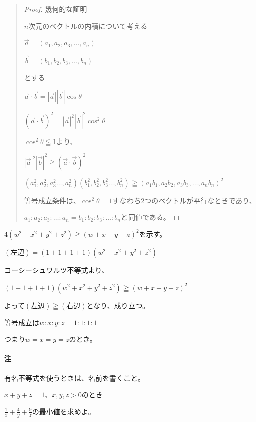 \documentclass[uplatex,dvipdfmx]{jsbook}
\begin{document}
\begin{quote}
    \begin{proof}
        幾何的な証明

        $n$次元のベクトルの内積について考える

        $\vec{a}=\left(a_1,a_2,a_3,\dots,a_n\right)$

        $\vec{b}=\left(b_1,b_2,b_3,\dots,b_n\right)$

        とする

        $\vec{a}\cdot\vec{b}=|\vec{a}||\vec{b}|\cos\theta$

        $\left(\vec{a}\cdot\vec{b}\right)^2=|\vec{a}|^2|\vec{b}|^2\cos^2\theta$

        $\cos^2\theta\leqq1$より、

        $|\vec{a}|^2|\vec{b}|^2\geqq\left(\vec{a}\cdot\vec{b}\right)^2$

        $\left(a^2_1,a^2_2,a^2_3\dots,a^2_n\right)\left(b^2_1,b^2_2,b^2_3\dots,b^2_n\right)\geqq\left(a_1b_1,a_2b_2,a_3b_3,\dots,a_nb_n\right)^2$

        等号成立条件は、$\cos^2\theta=1$すなわち2つのベクトルが平行なときであり、

        $a_1:a_2:a_3:\dots:a_n=b_1:b_2:b_3:\dots:b_n$と同値である。
    \end{proof}
\end{quote}

\begin{problem}[例題]
    $4\left(w^2+x^2+y^2+z^2\right)\geqq \left(w+x+y+z\right)^2$を示す。

    $\left(\text{左辺}\right)=\left(1+1+1+1\right)\left(w^2+x^2+y^2+z^2\right)$

    コーシーシュワルツ不等式より、

    $\left(1+1+1+1\right)\left(w^2+x^2+y^2+z^2\right)\geqq \left(w+x+y+z\right)^2$

    よって$\left(\text{左辺}\right)\geqq \left(右辺\right)$となり、成り立つ。

    等号成立は$w:x:y:z=1:1:1:1$

    つまり$w=x=y=z$のとき。
\end{problem}

\paragraph{注}有名不等式を使うときは、名前を書くこと。

\begin{problem}[練習問題]
    $x+y+z=1$、$x,y,z>0$のとき

    $\displaystyle \frac{1}{x}+\frac{4}{y}+\frac{9}{z}$の最小値を求めよ。
\end{problem}
\end{document}
